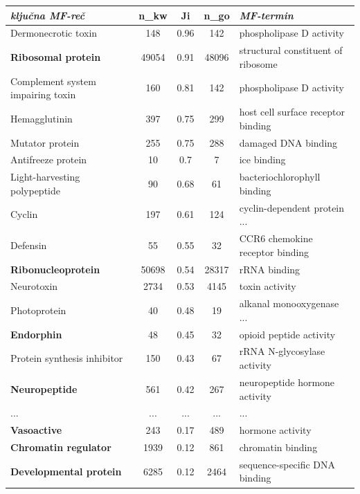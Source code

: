 \documentclass{beamer}
\newcommand{\keyword}[1]{\textbf{#1}}
\begin{document}
\begin{frame}

  \footnotesize
  \begin{tabular}{|p{4.2cm}|c|c|c|p{5cm}|}
    \hline
    \bf \textit{ključna MF-reč } & \bf n\_kw & \bf Ji & \bf n\_go & \bf \textit{MF-termin} \\
    \hline
    \hline
    Dermonecrotic toxin                & 148   & 0.96  & 142   & phospholipase D activity \\ \hline
    \keyword{Ribosomal protein}        & 49054 & 0.91  & 48096 & structural constituent of ribosome \\ \hline
    Complement system impairing  toxin & 160   & 0.81  & 142   & phospholipase D activity \\ \hline
    Hemagglutinin                      & 397   & 0.75  & 299   & host cell surface receptor binding \\ \hline
    Mutator protein                    & 255   & 0.75  & 288   & damaged DNA binding \\ \hline
    Antifreeze protein                 & 10    & 0.7   & 7     & ice binding \\ \hline
    Light-harvesting polypeptide       & 90    & 0.68  & 61    & bacteriochlorophyll binding \\ \hline
    Cyclin                             & 197   & 0.61  & 124   & cyclin-dependent protein ... \\ \hline
    Defensin                           & 55    & 0.55  & 32    & CCR6 chemokine receptor binding \\ \hline
    \keyword{Ribonucleoprotein}        & 50698 & 0.54  & 28317 & rRNA binding \\ \hline
    Neurotoxin                         & 2734  & 0.53  & 4145  & toxin activity \\ \hline
    Photoprotein                       & 40    & 0.48  & 19    & alkanal monooxygenase ... \\ \hline
    \keyword{Endorphin}                & 48    & 0.45  & 32    & opioid peptide activity \\ \hline
    Protein synthesis inhibitor        & 150   & 0.43  & 67    & rRNA N-glycosylase activity \\ \hline
    \keyword{Neuropeptide}             & 561   & 0.42  & 267   & neuropeptide hormone activity \\ \hline
    ... & ... & ... & ... &  ...\\
    \hline
    \keyword{Vasoactive}                            & 243   & 0.17  & 489   & hormone activity \\ \hline
    \keyword{Chromatin regulator}                   & 1939  & 0.12  & 861   & chromatin binding \\ \hline
    \keyword{Developmental protein}                 & 6285  & 0.12  & 2464  & sequence-specific DNA binding \\ \hline
  \end{tabular}

\end{frame}
\end{document}
